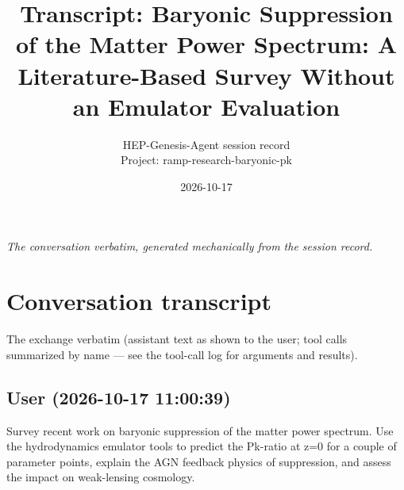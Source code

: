 \documentclass[11pt,a4paper]{article}
\title{Transcript: Baryonic Suppression of the Matter Power Spectrum: A Literature-Based Survey Without an Emulator Evaluation}
\author{HEP-Genesis-Agent session record \\ \small Project: ramp-research-baryonic-pk}
\date{2026-10-17}
\begin{document}
\maketitle
\noindent\textit{\small The conversation verbatim, generated mechanically from the session record.}
\vspace{1em}



\appendix
\section{Conversation transcript}
\label{app:transcript}
The exchange verbatim (assistant text as shown to the user; tool calls summarized by name --- see the tool-call log for arguments and results).
\subsection*{User \small(2026-10-17 11:00:39)}
Survey recent work on baryonic suppression of the matter power spectrum. Use the hydrodynamics emulator tools to predict the Pk-ratio at z=0 for a couple of parameter points, explain the AGN feedback physics of suppression, and assess the impact on weak-lensing cosmology.
\end{document}
